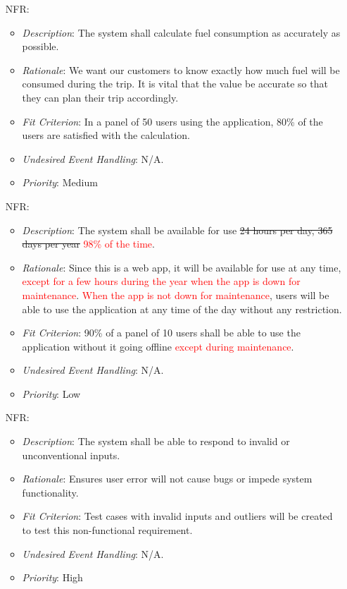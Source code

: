 \documentclass[12pt]{article}
\newcounter{nfrnum} %
\begin{document}
\begin{itemize}
\item[NFR\refstepcounter{nfrnum}\thenfrnum \label{NFR_9}:] 
\begin{itemize}
  \item \textit{Description}: The system shall calculate fuel consumption as accurately as possible.
  \item \textit{Rationale}: We want our customers to know exactly how much fuel will be consumed during the trip. It is vital that the value be accurate so that they can plan their trip accordingly.
  \item \textit{Fit Criterion}: In a panel of 50 users using the application, 80\% of the users are satisfied with the calculation.
  \item \textit{Undesired Event Handling}: N/A.
  \item \textit{Priority}: Medium
\end{itemize}

\item[NFR\refstepcounter{nfrnum}\thenfrnum \label{NFR_10}:] 
\begin{itemize}
  \item \textit{Description}: The system shall be available for use \sout{24 hours per day, 365 days per year} \textcolor{red}{98\% of the time}.
  \item \textit{Rationale}: Since this is a web app, it will be available for use at any time, \textcolor{red}{except for a few hours during the year when the app is down for maintenance}. \textcolor{red}{When the app is not down for maintenance}, users will be able to use the application at any time of the day without any restriction.
  \item \textit{Fit Criterion}: 90\% of a panel of 10 users shall be able to use the application without it going offline \textcolor{red}{except during maintenance}.
  \item \textit{Undesired Event Handling}: N/A.
  \item \textit{Priority}: Low
\end{itemize}

\item[NFR\refstepcounter{nfrnum}\thenfrnum \label{NFR_11}:] 
\begin{itemize}
  \item \textit{Description}: The system shall be able to respond to invalid or unconventional inputs.  
  \item \textit{Rationale}: Ensures user error will not cause bugs or impede system functionality. 
  \item \textit{Fit Criterion}: Test cases with invalid inputs and outliers will be created to test this non-functional requirement.  
  \item \textit{Undesired Event Handling}: N/A. 
  \item \textit{Priority}: High
\end{itemize}


\end{itemize}
\end{document}
